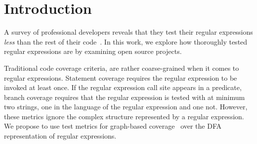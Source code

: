 \section{Introduction}
\label{sec:intro}





A survey of professional developers reveals that they test their regular expressions {\em less} than the rest of their code~\cite{chapman2016}.  In this work, we explore how thoroughly tested regular expressions are by examining open source projects. 

Traditional code coverage criteria, are rather coarse-grained when it comes to regular expressions. 
Statement coverage requires the  regular expression to be invoked at least once. 
If the regular expression call site appears in a predicate, branch coverage requires that the regular expression is tested with at minimum two strings, one in the language of the regular expression and one not. 
However, these metrics ignore the complex structure represented by a regular expression.
We propose to use test metrics for graph-based coverage~\cite{ammann2016introduction} over the DFA representation of regular expressions. %


